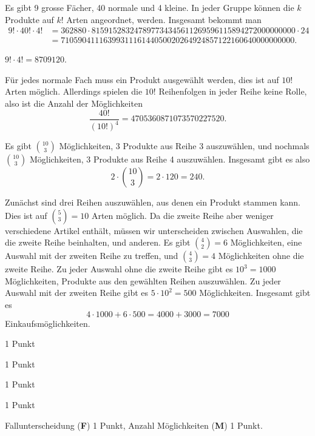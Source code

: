 \begin{loesung}
\begin{teilaufgaben}
\item Es gibt 9 grosse Fächer, 40 normale und 4 kleine. In jeder Gruppe
können die $k$ Produkte auf $k!$ Arten angeordnet, werden. Insgesamt 
bekommt man
\begin{align*}
9!\cdot 40!\cdot 4!&=
362880\cdot 815915283247897734345611269596115894272000000000 \cdot 24
\\
&=7105904111639931116144050020264924857122160640000000000.
\end{align*}
\item $9!\cdot 4!=8709120$.
\item
Für jedes normale Fach muss ein Produkt ausgewählt werden, dies ist
auf $10!$ Arten möglich. Allerdings spielen die $10!$ Reihenfolgen
in jeder Reihe keine Rolle, also ist die Anzahl der Möglichkeiten
\[
\frac{40!}{(10!)^4}=4705360871073570227520.
\]
\item
Es gibt $\binom{10}{3}$ Möglichkeiten, $3$ Produkte aus Reihe 3
auszuwählen, und nochmals $\binom{10}{3}$ Möglichkeiten, $3$ Produkte
aus Reihe 4 auszuwählen. Insgesamt gibt es also 
\[
2\cdot\binom{10}{3}=2\cdot 120=240.
\]
\item
Zunächst sind drei Reihen auszuwählen, aus denen ein Produkt stammen
kann.
Dies ist auf $\binom{5}{3}=10$ Arten möglich.
Da die zweite Reihe aber weniger verschiedene Artikel enthält, müssen
wir unterscheiden zwischen Auswahlen, die die zweite Reihe beinhalten,
und anderen.
Es gibt $\binom{4}{2}=6$ Möglichkeiten, eine Auswahl mit der zweiten
Reihe zu treffen, und $\binom{4}{3}=4$ Möglichkeiten ohne die zweite Reihe.
Zu jeder Auswahl ohne die zweite Reihe gibt es $10^3=1000$ Möglichkeiten,
Produkte aus den gewählten Reihen auszuwählen.
Zu jeder Auswahl mit der zweiten Reihe gibt es $5\cdot 10^2=500$ Möglichkeiten.
Insgesamt gibt es 
\[
4\cdot 1000
+
6\cdot 500
=4000 + 3000=7000
\]
Einkaufsmöglichkeiten.
\qedhere
\end{teilaufgaben}
\end{loesung}

\begin{bewertung}
\begin{teilaufgaben}
\item 1 Punkt
\item 1 Punkt
\item 1 Punkt
\item 1 Punkt
\item Fallunterscheidung (\textbf{F}) 1 Punkt,
Anzahl Möglichkeiten (\textbf{M}) 1 Punkt.
\end{teilaufgaben}
\end{bewertung}

